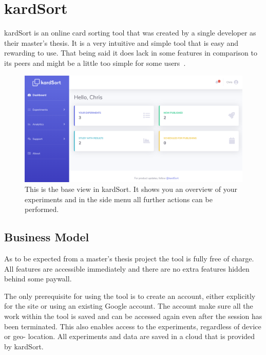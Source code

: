 \chapter{kardSort}

\label{chap:kardSort}


kardSort is an online card sorting tool that was created by a single
developer as their master's thesis. It is a very intuitive and simple
tool that is easy and rewarding to use. That being said it does lack
in some features in comparison to its peers and might be a little too
simple for some users~\parencite{kardSort}.

\begin{figure}[tp] 
\centering
\includegraphics[keepaspectratio,width=\linewidth,height=\halfh]{images/kardsort-dashboard.png}
\caption[kardSort Application] { This is the base view in kardSort.
It shows you an overview of your experiments and in the side menu all
further actions can be performed.
 }
\label{fig:kardSort1}
\end{figure}


\section{Business Model}
As to be expected from a master's thesis project the tool is fully 
free of charge. All features are accessible immediately and there are
no extra features hidden behind some paywall.

The only prerequisite for using the tool is to create an account,
either explicitly for the site or using an existing Google account.
The account make sure all the work within the tool is saved and can be
accessed again even after the session has been terminated. This also
enables access to the experiments, regardless of device or geo-
location. All experiments and data are saved in a cloud that is
provided by kardSort.

